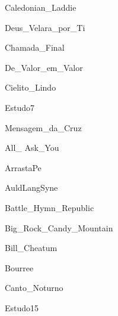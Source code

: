 \documentclass{scrartcl}
\begin{document}

{Caledonian_Laddie}



{Deus_Velara_por_Ti}



{Chamada_Final}



{De_Valor_em_Valor}



{Cielito_Lindo}



{Estudo7}



{Mensagem_da_Cruz}



{All_ Ask_You}



{ArrastaPe}



{AuldLangSyne}



{Battle_Hymn_Republic}



{Big_Rock_Candy_Mountain}



{Bill_Cheatum}



{Bourree}



{Canto_Noturno}


{Estudo15}
\end{document}
